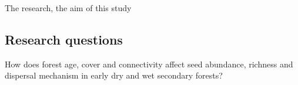 The research, the aim of this study


\subsection{Research questions}

How does forest age, cover and connectivity affect seed abundance, richness and dispersal mechanism in early dry and wet secondary forests?